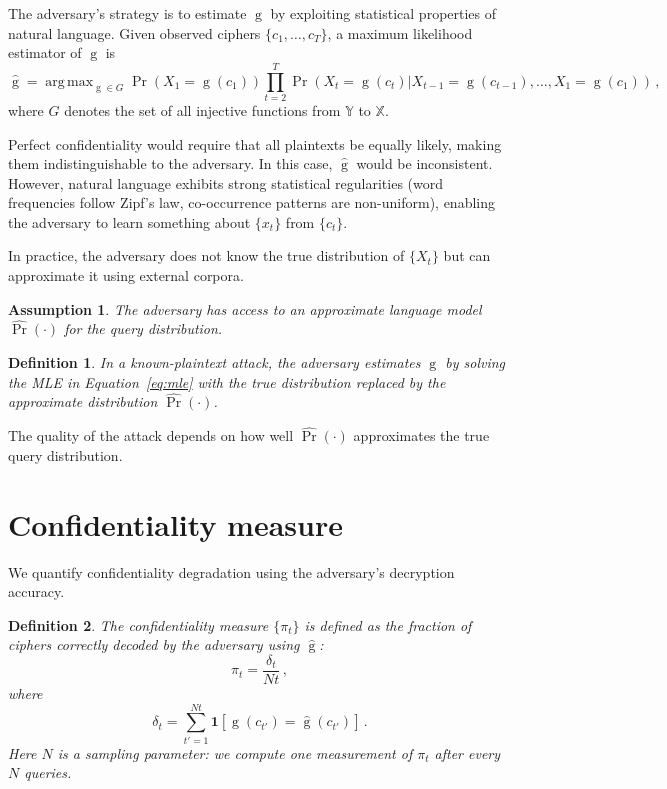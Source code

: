\documentclass[final,11pt]{article}
\newcommand{\argmax}{\operatorname{arg\,max}}
\newcommand{\set}[1]{\mathbb{#1}}
\theoremstyle{plain}
\newtheorem{definition}{Definition}
\newtheorem{assumption}{Assumption}
\theoremstyle{remark}
\begin{document}
The adversary's strategy is to estimate $\operatorname{g}$ by exploiting
statistical properties of natural language. Given observed ciphers
$\{c_1,\ldots,c_T\}$, a maximum likelihood estimator of $\operatorname{g}$
is
\begin{equation}
\label{eq:mle}
    \hat{\operatorname{g}} = \argmax_{\operatorname{g} \in G}
    \Pr(X_1 = \operatorname{g}(c_1)) \prod_{t=2}^{T} \Pr(X_t =
    \operatorname{g}(c_t) | X_{t-1} = \operatorname{g}(c_{t-1}),
            \ldots, X_1 = \operatorname{g}(c_1))\,,
\end{equation}
where $G$ denotes the set of all injective functions from $\set{Y}$ to
$\set{X}$.

Perfect confidentiality would require that all plaintexts be equally likely,
making them indistinguishable to the adversary. In this case,
$\hat{\operatorname{g}}$ would be inconsistent. However, natural language
exhibits strong statistical regularities (word frequencies follow Zipf's law,
co-occurrence patterns are non-uniform), enabling the adversary to learn
something about $\{x_t\}$ from $\{c_t\}$.

In practice, the adversary does not know the true distribution of $\{X_t\}$
but can approximate it using external corpora.

\begin{assumption}
The adversary has access to an approximate language model
$\hat{\Pr}(\cdot)$ for the query distribution.
\end{assumption}

\begin{definition}
In a \emph{known-plaintext attack}, the adversary estimates
$\operatorname{g}$ by solving the MLE in Equation~\eqref{eq:mle} with
the true distribution replaced by the approximate distribution
$\hat{\Pr}(\cdot)$.
\end{definition}

The quality of the attack depends on how well $\hat{\Pr}(\cdot)$ approximates
the true query distribution.

\section{Confidentiality measure}

We quantify confidentiality degradation using the adversary's decryption
accuracy.

\begin{definition}
The confidentiality measure $\{\pi_t\}$ is defined as the fraction of
ciphers correctly decoded by the adversary using $\hat{\operatorname{g}}$:
\begin{equation}
\label{eq:accuracy}
    \pi_t = \frac{\delta_t}{Nt}\,,
\end{equation}
where
\begin{equation}
    \delta_t = \sum_{t'=1}^{Nt} \mathbf{1}[\operatorname{g}(c_{t'}) = \hat{\operatorname{g}}(c_{t'})]\,.
\end{equation}
Here $N$ is a sampling parameter: we compute one measurement of $\pi_t$
after every $N$ queries.
\end{definition}
\end{document}
